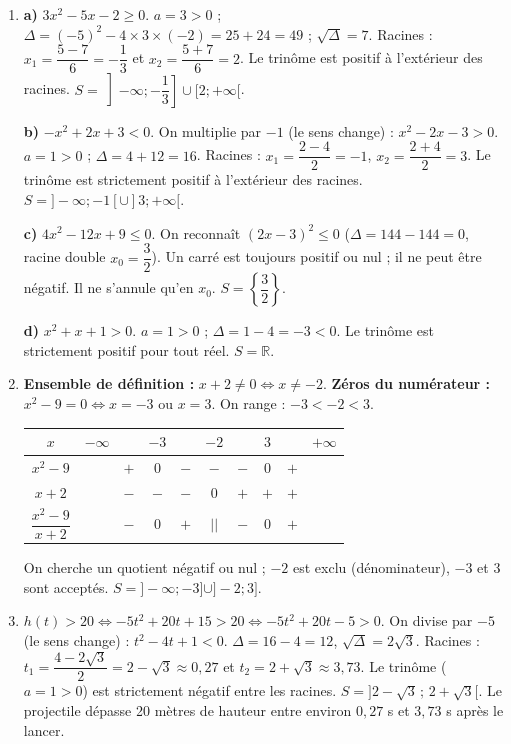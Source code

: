 \documentclass[11pt]{article}
\begin{document}
\begin{corrige}[Exercice n°1]
\begin{enumerate}
    \item \textbf{a)} $3x^2-5x-2 \geq 0$. $a=3>0$ ; $\Delta=(-5)^2-4\times 3\times(-2)=25+24=49$ ; $\sqrt{\Delta}=7$. Racines : $x_1=\dfrac{5-7}{6}=-\dfrac{1}{3}$ et $x_2=\dfrac{5+7}{6}=2$. Le trinôme est positif à l'extérieur des racines. $S = \left]-\infty; -\dfrac{1}{3}\right] \cup [2; +\infty[$.

    \textbf{b)} $-x^2+2x+3 < 0$. On multiplie par $-1$ (le sens change) : $x^2-2x-3 > 0$. $a=1>0$ ; $\Delta=4+12=16$. Racines : $x_1=\dfrac{2-4}{2}=-1$, $x_2=\dfrac{2+4}{2}=3$. Le trinôme est strictement positif à l'extérieur des racines. $S = ]-\infty; -1[ \cup ]3; +\infty[$.

    \textbf{c)} $4x^2-12x+9 \leq 0$. On reconnaît $(2x-3)^2 \leq 0$ ($\Delta = 144-144=0$, racine double $x_0=\dfrac{3}{2}$). Un carré est toujours positif ou nul ; il ne peut être négatif. Il ne s'annule qu'en $x_0$. $S = \left\{\dfrac{3}{2}\right\}$.

    \textbf{d)} $x^2+x+1 > 0$. $a=1>0$ ; $\Delta=1-4=-3<0$. Le trinôme est strictement positif pour tout réel. $S = \mathbb{R}$.

    \item \textbf{Ensemble de définition :} $x+2 \neq 0 \iff x \neq -2$. \textbf{Zéros du numérateur :} $x^2-9=0 \iff x=-3$ ou $x=3$. On range : $-3 < -2 < 3$.
    \begin{center}
    \begin{tabular}{|c|ccccccccc|}\hline
    $x$ & $-\infty$ & & $-3$ & & $-2$ & & $3$ & & $+\infty$ \\ \hline
    $x^2-9$ & & $+$ & $0$ & $-$ & $-$ & $-$ & $0$ & $+$ & \\
    $x+2$ & & $-$ & $-$ & $-$ & $0$ & $+$ & $+$ & $+$ & \\ \hline
    $\dfrac{x^2-9}{x+2}$ & & $-$ & $0$ & $+$ & $||$ & $-$ & $0$ & $+$ & \\ \hline
    \end{tabular}
    \end{center}
    On cherche un quotient négatif ou nul ; $-2$ est exclu (dénominateur), $-3$ et $3$ sont acceptés.
    $S = ]-\infty; -3] \cup ]-2; 3]$.

    \item $h(t) > 20 \iff -5t^2+20t+15 > 20 \iff -5t^2+20t-5 > 0$. On divise par $-5$ (le sens change) : $t^2-4t+1 < 0$.
    $\Delta=16-4=12$, $\sqrt{\Delta}=2\sqrt{3}$. Racines : $t_1=\dfrac{4-2\sqrt{3}}{2}=2-\sqrt{3}\approx 0,27$ et $t_2=2+\sqrt{3}\approx 3,73$. Le trinôme ($a=1>0$) est strictement négatif entre les racines.
    $S = ]2-\sqrt{3}\,;\, 2+\sqrt{3}[$. Le projectile dépasse 20 mètres de hauteur entre environ $0,27$ s et $3,73$ s après le lancer.
\end{enumerate}
\end{corrige}
\end{document}
